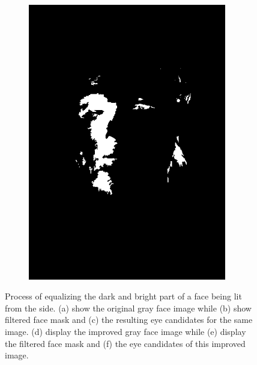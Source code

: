\begin{figure}[H]
\begin{subfigure}{.16\textwidth}
  \includegraphics[width=0.95\textwidth]{img/fd3/grayFaceSpecialEyeCandidates.png}
  \caption{}
\end{subfigure}%

\caption{Process of equalizing the dark and bright part of a face being lit from the side. (a) show the original gray face image while (b) show filtered face mask and (c) the resulting eye candidates for the same image. (d) display the improved gray face image while (e) display the filtered face mask and (f) the eye candidates of this improved image.}
\label{fig:grayFace}
\end{figure}